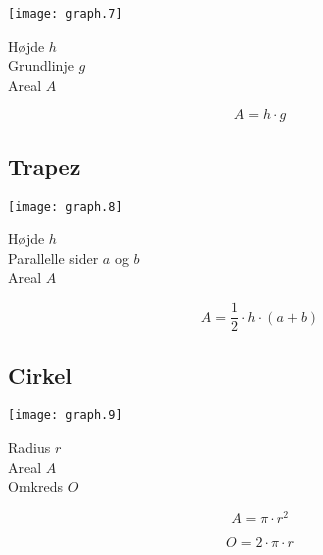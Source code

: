 \documentclass[11pt,a4paper,landscape,twocolumn,fleqn,leqno]{article}
\begin{document}
\texttt{[image: graph.7]}

Højde $h$ \\
Grundlinje $g$ \\
Areal $A$

\begin{equation}
A = h \cdot g
\end{equation}

\vfill

\subsection{Trapez}

\texttt{[image: graph.8]}

Højde $h$ \\
Parallelle sider $a$ og $b$ \\
Areal $A$

\begin{equation}
A = \frac{1}{2} \cdot h \cdot (a + b)
\end{equation}

\vfill

\subsection{Cirkel}

\texttt{[image: graph.9]}

Radius $r$ \\
Areal $A$ \\
Omkreds $O$

\begin{equation}
A = \pi \cdot r^2
\end{equation}

\begin{equation}
O = 2 \cdot \pi \cdot r
\end{equation}

\vfill
\end{document}
